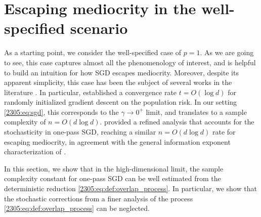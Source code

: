 \section{Escaping mediocrity in the well-specified scenario}

As a starting point, we consider the well-specified case of $p=1$. As we are going to see, this case captures almost all the phenomenology of interest, and is helpful to build an intuition for how SGD escapes mediocrity. Moreover, despite its apparent simplicity, this case has been the subject of several works in the literature \citep{sun2016geometric,tan2019online,chen2019gradient,arous2021online}. In particular, \cite{chen2019gradient} established a convergence rate $t=O(\log{d})$ for randomly initialized gradient descent on the population risk. In our setting \eqref{2305:eq:sgd}, this corresponds to the $\gamma\to 0^{+}$ limit, and translates to a sample complexity of $n=O(d\log{d})$. \cite{tan2019online} provided a refined analysis that accounts for the stochasticity in one-pass SGD, reaching a similar $n=O(d\log{d})$ rate for escaping mediocrity, in agreement with the general information exponent characterization of \cite{arous2021online}. 

In this section, we show that in the high-dimensional limit, the sample complexity constant for one-pass SGD can be well estimated from the deterministic reduction \eqref{2305:eq:def:overlap_process}. In particular, we show that the stochastic corrections from a finer analysis of the process \eqref{2305:eq:def:overlap_process} can be neglected. 

